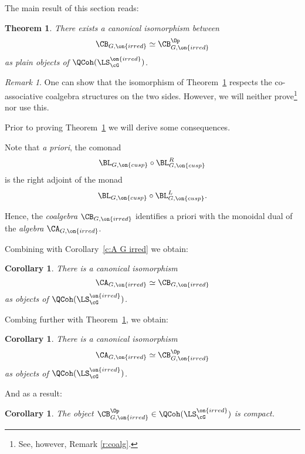 \documentclass[9pt]{amsart}
\newtheorem{cor}[subsubsection]{Corollary}
\newtheorem{thm}[subsubsection]{Theorem}
\theoremstyle{remark}
\newtheorem{rem}[subsubsection]{Remark}
\theoremstyle{definition}
\theoremstyle{remark}
\newcommand{\thmref}[1]{Theorem~\ref{#1}}
\newcommand{\corref}[1]{Corollary~\ref{#1}}
\numberwithin{equation}{section}
\begin{document}
\sssec{}

The main result of this section reads: 

\begin{thm} \label{t:BG via Op}
There exists a canonical isomorphism between 
$$\CB_{G,\on{irred}}\simeq \CB^{\Op}_{G,\on{irred}}$$
as plain objects of $\QCoh(\LS^{\on{irred}}_\cG)$. 
\end{thm}

\begin{rem}
One can show that the isomorphism of \thmref{t:BG via Op} respects the co-associative coalgebra
structures on the two sides. However, we will neither prove\footnote{See, however, Remark \ref{r:coalg}.} nor use this.
\end{rem} 


Prior to proving \thmref{t:BG via Op} we will derive some consequences.

\sssec{}

Note that \emph{a priori}, the comonad $$\BL_{G,\on{cusp}}\circ \BL^R_{G,\on{cusp}}$$ is the right adjoint 
of the monad $$\BL_{G,\on{cusp}}\circ \BL^L_{G,\on{cusp}}.$$

\medskip

Hence, the \emph{coalgebra} $\CB_{G,\on{irred}}$ identifies a priori with the monoidal dual of the \emph{algebra}
$\CA_{G,\on{irred}}$.

\sssec{}

Combining with \corref{c:A G irred} we obtain:

\begin{cor} \label{c:A=B}
There is a canonical isomorphism 
$$\CA_{G,\on{irred}}\simeq \CB_{G,\on{irred}}$$
as objects of $\QCoh(\LS^{\on{irred}}_\cG)$. 
\end{cor}

\sssec{}

Combing further with \thmref{t:BG via Op}, we obtain:

\begin{cor} \label{c:A=B Op}
There is a canonical isomorphism 
$$\CA_{G,\on{irred}}\simeq \CB^{\Op}_{G,\on{irred}}$$
as objects of $\QCoh(\LS^{\on{irred}}_\cG)$. 
\end{cor}

And as a result:

\begin{cor} \label{c:BG is compact}
The object $\CB^{\Op}_{G,\on{irred}}\in \QCoh(\LS^{\on{irred}}_\cG)$ is compact. 
\end{cor} 
\end{document}
